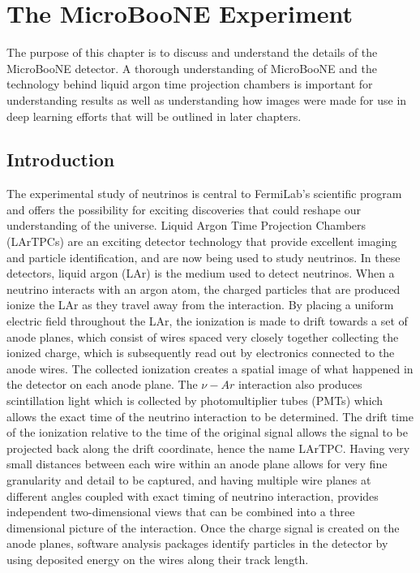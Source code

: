 \chapter{The MicroBooNE Experiment}
The purpose of this chapter is to discuss and understand the details of the MicroBooNE detector. A thorough understanding of MicroBooNE and the technology behind liquid argon time projection chambers is important for understanding results as well as understanding how images were made for use in deep learning efforts that will be outlined in later chapters.   

\section{Introduction}
The experimental study of neutrinos is central to FermiLab's scientific program and offers the possibility for exciting discoveries that could reshape our understanding of the universe. Liquid Argon Time Projection Chambers (LArTPCs) are an exciting detector technology that provide excellent imaging and particle identification, and are now being used to study neutrinos. In these detectors, liquid argon (LAr) is the medium used to detect neutrinos. When a neutrino interacts with an argon atom, the charged particles that are produced ionize the LAr as they travel away from the interaction. By placing a uniform electric field throughout the LAr, the ionization is made to drift towards a set of anode planes, which consist of wires spaced very closely together collecting the ionized charge, which is subsequently read out by electronics connected to the anode wires. The collected ionization creates a spatial image of what happened in the detector on each anode plane. The $\nu-Ar$ interaction also produces scintillation light which is collected by photomultiplier tubes (PMTs) which allows the exact time of the neutrino interaction to be determined. The drift time of the ionization relative to the time of the original signal allows the signal to be projected back along the drift coordinate, hence the name LArTPC. Having very small distances between each wire within an anode plane allows for very fine granularity and detail to be captured, and having multiple wire planes at different angles coupled with exact timing of neutrino interaction, provides independent two-dimensional views that can be combined into a three dimensional picture of the interaction. Once the charge signal is created on the anode planes, software analysis packages identify particles in the detector by using deposited energy on the wires along their track length. 

